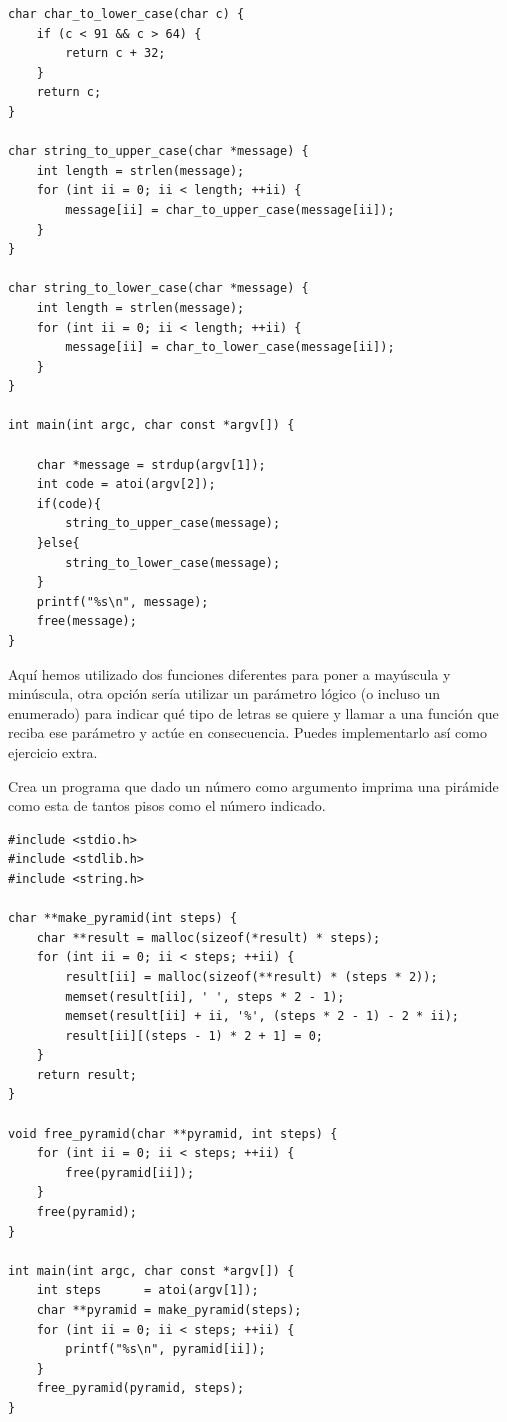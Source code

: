 \documentclass[a4paper]{article}
\begin{document}
\begin{exercises}
\begin{minipage}[H]{\linewidth}
\begin{lstlisting}[style=C,
caption={Solución al ejercicio 20},
label={lst:solution20}]
char char_to_lower_case(char c) {
    if (c < 91 && c > 64) {
        return c + 32;
    }
    return c;
}

char string_to_upper_case(char *message) {
    int length = strlen(message);
    for (int ii = 0; ii < length; ++ii) {
        message[ii] = char_to_upper_case(message[ii]);
    }
}

char string_to_lower_case(char *message) {
    int length = strlen(message);
    for (int ii = 0; ii < length; ++ii) {
        message[ii] = char_to_lower_case(message[ii]);
    }
}

int main(int argc, char const *argv[]) {

    char *message = strdup(argv[1]);
    int code = atoi(argv[2]);
    if(code){
        string_to_upper_case(message);
    }else{
        string_to_lower_case(message);
    }
    printf("%s\n", message);
    free(message);
}
\end{lstlisting}
\end{minipage}

Aquí hemos utilizado dos funciones diferentes para poner a mayúscula y
minúscula, otra opción sería utilizar un parámetro lógico (o incluso un
enumerado) para indicar qué tipo de letras se quiere y llamar a una función
que reciba ese parámetro y actúe en consecuencia. Puedes implementarlo así
como ejercicio extra.

\item Crea un programa que dado un número como argumento imprima una pirámide
como esta de tantos pisos como el número indicado.

\noindent
\begin{minipage}[H]{\linewidth}
\mbox{}
\begin{lstlisting}[style=C,
caption={Solución al ejercicio 21},
label={lst:solution21}]
#include <stdio.h>
#include <stdlib.h>
#include <string.h>

char **make_pyramid(int steps) {
    char **result = malloc(sizeof(*result) * steps);
    for (int ii = 0; ii < steps; ++ii) {
        result[ii] = malloc(sizeof(**result) * (steps * 2));
        memset(result[ii], ' ', steps * 2 - 1);
        memset(result[ii] + ii, '%', (steps * 2 - 1) - 2 * ii);
        result[ii][(steps - 1) * 2 + 1] = 0;
    }
    return result;
}

void free_pyramid(char **pyramid, int steps) {
    for (int ii = 0; ii < steps; ++ii) {
        free(pyramid[ii]);
    }
    free(pyramid);
}

int main(int argc, char const *argv[]) {
    int steps      = atoi(argv[1]);
    char **pyramid = make_pyramid(steps);
    for (int ii = 0; ii < steps; ++ii) {
        printf("%s\n", pyramid[ii]);
    }
    free_pyramid(pyramid, steps);
}
\end{lstlisting}
\end{minipage}





\end{exercises}
\end{document}
